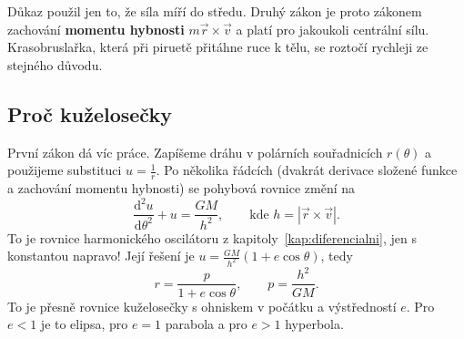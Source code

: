 Důkaz použil jen to, že síla míří do středu. Druhý zákon je proto zákonem zachování \textbf{momentu hybnosti} $m\vec{r}\times\vec{v}$ a platí pro jakoukoli centrální sílu. Krasobruslařka, která při piruetě přitáhne ruce k tělu, se roztočí rychleji ze stejného důvodu.

\subsection{Proč kuželosečky}

První zákon dá víc práce. Zapíšeme dráhu v polárních souřadnicích $r(\theta)$ a použijeme substituci $u = \frac{1}{r}$. Po několika řádcích (dvakrát derivace složené funkce a zachování momentu hybnosti) se pohybová rovnice změní na
\begin{equation*}
  \frac{\mathrm{d}^2u}{\mathrm{d}\theta^2} + u = \frac{GM}{h^2},\qquad\text{kde } h = |\vec{r}\times\vec{v}|.
\end{equation*}
To je rovnice harmonického oscilátoru z kapitoly~\ref{kap:diferencialni}, jen s konstantou napravo! Její řešení je $u = \frac{GM}{h^2}(1 + e\cos\theta)$, tedy
\begin{equation*}
  r = \frac{p}{1 + e\cos\theta},\qquad p = \frac{h^2}{GM}.
\end{equation*}
To je přesně rovnice kuželosečky s ohniskem v počátku a výstředností $e$. Pro $e < 1$ je to elipsa, pro $e = 1$ parabola a pro $e > 1$ hyperbola.

\begin{center}
\end{center}

